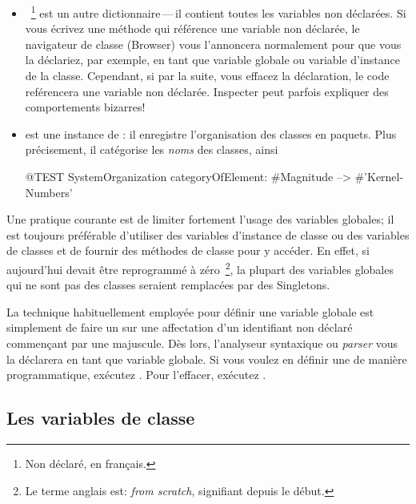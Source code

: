\documentclass[a4paper,10pt,twoside]{book}
\begin{document}
\begin{itemize}
\item
{}~\footnote{Non d\'eclar\'e, en fran\c{c}ais.} est un autre dictionnaire\,---\,il contient toutes les variables non d\'eclar\'ees.
Si vous \'ecrivez une m\'ethode qui r\'ef\'erence une variable non d\'eclar\'ee,
le navigateur de classe (Browser) vous l'annoncera normalement
pour que vous la d\'eclariez, par exemple, en tant que variable globale ou variable d'instance de la classe.
Cependant, si par la suite, vous effacez la d\'eclaration, le code ref\'erencera une variable non d\'eclar\'ee. 
Inspecter  peut parfois expliquer des comportements bizarres!

\item
{} est une instance de : il enregistre l'organisation des classes en paquets.  Plus pr\'ecisement, il cat\'egorise les \emph{noms} des classes, ainsi
\begin{code}{@TEST}
SystemOrganization categoryOfElement: #Magnitude --> #'Kernel-Numbers'
\end{code}

\end{itemize}

Une pratique courante est de limiter fortement l'usage des variables globales;
il est toujours pr\'ef\'erable d'utiliser des variables d'instance de classe ou des variables de classes et de fournir des m\'ethodes de classe pour y acc\'eder.
En effet, si aujourd'hui \squeak devait \^etre reprogramm\'e \`a z\'ero~\footnote{Le terme anglais est: \emph{from scratch}, signifiant depuis le d\'ebut.}, la plupart des variables globales qui ne sont pas des classes seraient remplac\'ees par des Singletons.

La technique habituellement employ\'ee pour d\'efinir une variable globale
est simplement de faire un  sur une affectation d'un identifiant
non d\'eclar\'e commen\c{c}ant par une majuscule. D\`es lors,
l'analyseur syntaxique ou \emph{parser} vous 
la d\'eclarera en tant que variable globale.  
Si vous voulez en d\'efinir une de mani\`ere programmatique, ex\'ecutez
.
Pour l'effacer, ex\'ecutez .

\subsection{Les variables de classe}
\label{sec:classVars}
\end{document}
